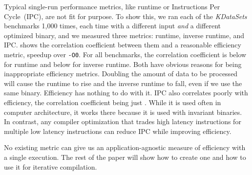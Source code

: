     Typical single-run performance metrics, like runtime or Instructions Per Cycle~(IPC), are not fit for purpose. To show this, we ran
    each of the  \textit{KDataSets} benchmarks 1,000 times, each time with a different input \textit{and} a different optimized
    binary, and we measured three metrics: runtime, inverse runtime, and IPC.  shows the correlation coefficient between
    them and a reasonable efficiency metric, speedup over \texttt{-O0}. For all benchmarks, the correlation coefficient is below
     for runtime and below  for inverse runtime. Both have obvious reasons for being inappropriate efficiency
    metrics. Doubling the amount of data to be processed will cause the runtime to rise and the inverse runtime to fall, even if we use the same binary.
    Efficiency has nothing to do with it. IPC also correlates poorly with efficiency, the correlation coefficient being just .
    While it is used often in computer architecture, it works there because it is used with invariant binaries. In contrast, any compiler
    optimization that trades high latency instructions for multiple low latency instructions can reduce IPC while improving efficiency.
    
    No existing metric can give us an application-agnostic measure of efficiency with a single execution. The rest of the paper will show
    how to create one and how to use it for iterative compilation. 


